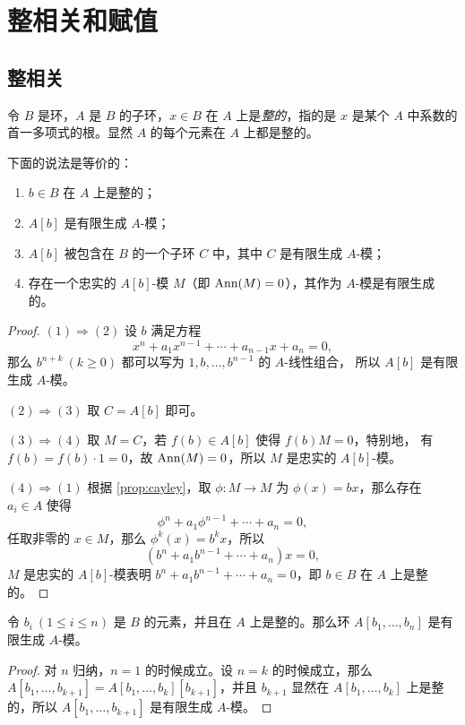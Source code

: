 \chapter{整相关和赋值}

\section{整相关}

令 $B$ 是环，$A$ 是 $B$ 的子环，$x\in B$ 在 $A$ 上是\emph{整的}，指的是
$x$ 是某个 $A$ 中系数的首一多项式的根。显然 $A$ 的每个元素在 $A$ 上都是整的。

\begin{proposition}\label{prop:integral dependence}
  下面的说法是等价的：
  \begin{enumerate}
    \item $b\in B$ 在 $A$ 上是整的；
    \item $A[b]$ 是有限生成 $A$-模；
    \item $A[b]$ 被包含在 $B$ 的一个子环 $C$ 中，其中 $C$ 是有限生成 $A$-模；
    \item 存在一个忠实的 $A[b]$-模 $M$（即 $\operatorname{Ann}(M)=0$），其作为 $A$-模是有限生成的。
  \end{enumerate}
\end{proposition}
\begin{proof}
  $(1)\Rightarrow (2)$ 设 $b$ 满足方程
  \[
    x^n+a_{1}x^{n-1}+\cdots+  a_{n-1}x+a_n=0,
  \]
  那么 $b^{n+k}\ (k\geq 0)$ 都可以写为 $1,b,\dots,b^{n-1}$ 的 $A$-线性组合，
  所以 $A[b]$ 是有限生成 $A$-模。

  $(2)\Rightarrow (3)$ 取 $C=A[b]$ 即可。

  $(3)\Rightarrow (4)$ 取 $M=C$，若 $f(b)\in A[b]$ 使得 $f(b)M=0$，特别地，
  有 $f(b)=f(b)\cdot 1=0$，故 $\operatorname{Ann}(M)=0$，所以 $M$ 是忠实的 $A[b]$-模。

  $(4)\Rightarrow (1)$ 根据 \autoref{prop:cayley}，取 $\phi:M\to M$
  为 $\phi(x)=bx$，那么存在 $a_i\in A$ 使得
  \[
    \phi^n+a_1\phi^{n-1}+\cdots+a_n=0,  
  \]
  任取非零的 $x\in M$，那么 $\phi^k(x)=b^k x$，所以
  \[
    (b^n+a_1b^{n-1}+\cdots+a_n)x=0,  
  \]
  $M$ 是忠实的 $A[b]$-模表明 $b^n+a_1b^{n-1}+\cdots+a_n=0$，即 $b\in B$ 在 $A$ 上是整的。
\end{proof}

\begin{corollary}\label{coro:f.g. algebra is f.g. module}
  令 $b_i\ (1\leq i\leq n)$ 是 $B$ 的元素，并且在 $A$ 上是整的。那么环
  $A[b_1,\dots,b_n]$ 是有限生成 $A$-模。
\end{corollary}
\begin{proof}
  对 $n$ 归纳，$n=1$ 的时候成立。设 $n=k$ 的时候成立，那么
  $A[b_1,\dots,b_{k+1}]=A[b_1,\dots,b_k][b_{k+1}]$，并且 $b_{k+1}$
  显然在 $A[b_1,\dots,b_k]$ 上是整的，所以 $A[b_1,\dots,b_{k+1}]$
  是有限生成 $A$-模。
\end{proof}

